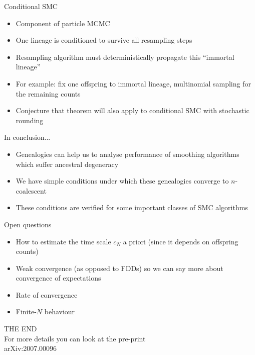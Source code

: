 \documentclass[aspectratio=169]{beamer}
\theoremstyle{definition}
\begin{document}
\begin{frame}{Conditional SMC}
\begin{itemize}
\item Component of particle MCMC
\item One lineage is conditioned to survive all resampling steps
\item Resampling algorithm must deterministically propagate this ``immortal lineage''
\item For example: fix one offspring to immortal lineage, multinomial sampling for the remaining counts
\item Conjecture that theorem will also apply to conditional SMC with stochastic rounding
\end{itemize}
\end{frame}


\begin{frame}{In conclusion...}
\begin{itemize}
\item Genealogies can help us to analyse performance of smoothing algorithms which suffer ancestral degeneracy
\item We have simple conditions under which these genealogies converge to $n$-coalescent
\item These conditions are verified for some important classes of SMC algorithms
\end{itemize}

\pause

Open questions
\begin{itemize}
\item How to estimate the time scale $c_N$ a priori (since it depends on offspring counts)
\item Weak convergence (as opposed to FDDs) so we can say more about convergence of expectations
\item Rate of convergence
\item Finite-$N$ behaviour
\end{itemize}
\end{frame}

%
%


\begin{frame}
\centering
\vspace{1cm}
THE END\\
\vspace{1cm}
For more details you can look at the pre-print\\
arXiv:2007.00096
\end{frame}
\end{document}
